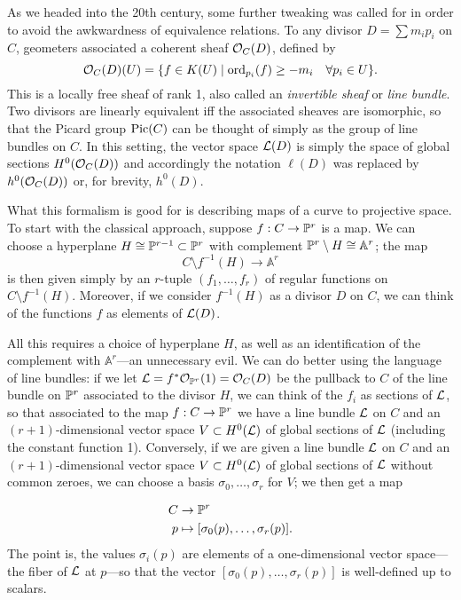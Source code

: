 \documentclass[12pt, leqno]{book}
\def\AA{{\mathbb A}}
\def\cL{{\cal L}}
\begin{document}
As we headed into the 20th century, some further tweaking was called for in order to avoid the awkwardness of equivalence relations. To any divisor $D = \sum m_ip_i$ on $C$, geometers associated a coherent sheaf $\cO_C(D)$, defined by
$$
\cO_C(D)(U) = \{ f \in K(U) \mid \ord_{p_i}(f) \geq -m_i \quad \forall p_i \in U \}.
$$
This is a locally free sheaf of rank 1, also called an \emph{invertible sheaf} or \emph{line bundle}. Two divisors are linearly equivalent iff the associated sheaves are isomorphic, so that the Picard group $\Pic(C)$ can be thought of simply as the group of line bundles on $C$. In this setting, the vector space $\cL(D)$ is simply the space of global sections $H^0(\cO_C(D))$ and accordingly the notation $\ell(D)$ was replaced by $h^0(\cO_C(D))$ or, for brevity, $h^0(D)$. 

What this formalism is good for is describing maps of a curve to projective space. To start with the classical approach, suppose $f : C \to \PP^r$ is a map. We can choose a hyperplane $H \cong \PP^{r-1} \subset \PP^r$ with complement $\PP^r \setminus H \cong \AA^r$; the map 
$$
C \setminus f^{-1}(H) \to \AA^r
$$
is then given simply by an $r$-tuple $(f_1,\dots,f_r)$ of regular functions on $C \setminus f^{-1}(H)$. Moreover, if we consider $f^{-1}(H)$ as a divisor $D$ on $C$, we can think of the functions $f$ as elements of $\cL(D)$.

All this requires a choice of hyperplane $H$, as well as an identification of the complement with $\AA^r$---an unnecessary evil. We can do better using the language of line bundles: if we let $\cL = f^*\cO_{\PP^r}(1) = \cO_C(D)$ be the pullback to $C$ of the line bundle on $\PP^r$ associated to the divisor $H$, we can think of the $f_i$ as sections of $\cL$, so that associated to the map $f : C \to \PP^r$ we have a line bundle $\cL$ on $C$ and an $(r+1)$-dimensional vector space $V \subset H^0(\cL)$ of global sections of $\cL$ (including the constant function 1). Conversely, if we are given a line bundle $\cL$ on $C$ and an $(r+1)$-dimensional vector space $V \subset H^0(\cL)$ of global sections of $\cL$ without common zeroes, we can choose a basis $\sigma_0,\dots,\sigma_r$ for $V$; we then get a map 

\begin{align*}
C &\to \PP^r \\
p &\mapsto [\sigma_0(p),\dots,\sigma_r(p)].
\end{align*}
The point is,  the values $\sigma_i(p)$ are elements of a one-dimensional vector space---the fiber of $\cL$ at $p$---so that the vector $[\sigma_0(p),\dots,\sigma_r(p)]$ is well-defined up to scalars.
\end{document}
